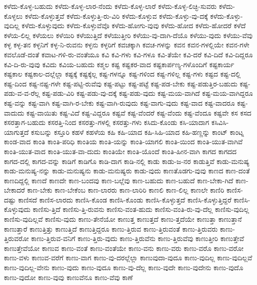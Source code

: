 {ಕಳೆದು-ಕೊಳ್ಳ-ಬಹುದು
ಕಳೆದು-ಕೊಳ್ಳ-ಲಾರ-ನೆಂದು
ಕಳೆದು-ಕೊಳ್ಳ-ಲಾರೆ
ಕಳೆದು-ಕೊಳ್ಳ-ಲಿಚ್ಛಿ-ಸುವರು
ಕಳೆದು-ಕೊಳ್ಳಲು
ಕಳೆದು-ಕೊಳ್ಳುತ್ತವೆ
ಕಳೆದು-ಕೊಳ್ಳುತ್ತಿ-ರು-ವಿರಿ
ಕಳೆದು-ಕೊಳ್ಳುವ
ಕಳೆದು-ಕೊಳ್ಳು-ವು-ದಕ್ಕೆ
ಕಳೆದು-ಕೊಳ್ಳು-ವುದಿಲ್ಲ
ಕಳೆದು-ಕೊಳ್ಳುವುದು
ಕಳೆದು-ಕೊಳ್ಳುವೆವೊ
ಕಳೆದು-ಹೋಗು-ವುವು
ಕಳೆದು-ಹೋದ
ಕಳೆದು-ಹೋದರೆ
ಕಳೆದೆ
ಕಳೆಯ-ಲಿಲ್ಲ
ಕಳೆಯಲು
ಕಳೆಯಿರಿ
ಕಳೆಯುತ್ತಿದೆ
ಕಳೆಯುತ್ತೀರಿ
ಕಳೆಯು-ವು-ದಾಗಿ-ದೆಯೊ
ಕಳೆಯು-ವುದು
ಕಳೆಯು-ವೆವು
ಕಳ್ಳ
ಕಳ್ಳ-ತನ
ಕಳ್ಳನಿಗೆ
ಕಳ್ಳ-ನಿ-ರುವನು
ಕಳ್ಳನು
ಕಳ್ಳರಿಗೆ
ಕವಚಕ್ಕಾಗಿ
ಕವಚ-ಗಳನ್ನು
ಕವನ
ಕವನ-ಗಳಲ್ಲಿಯೇ
ಕವನ-ಗಳೇ
ಕವಲೊಡೆ-ದಂತೆ
ಕವಾಟ-ಗಳಿ-ರು-ವಂತೆಯೂ
ಕವಿ
ಕವಿ-ಗಳು
ಕವಿ-ಗಳೂ
ಕವಿ-ತೆಯೇ
ಕವಿ-ದರೆ
ಕವಿ-ದಿದೆ
ಕವಿ-ದಿದ್ದರೂ
ಕವಿ-ದಿ-ರು-ವುವು
ಕವಿದು
ಕವಿಯ-ಬಹುದು
ಕಶ್ಮಲ
ಕಷ್ಟ
ಕಷ್ಟಕರ-ವಾದ
ಕಷ್ಟಕಾರ್ಪಣ್ಯ-ಗಳೊಂದಿಗೆ
ಕಷ್ಟಕಾರ್ಯ
ಕಷ್ಟಕಾಲ
ಕಷ್ಟಕಾಲ-ದಲ್ಲೆಲ್ಲಾ
ಕಷ್ಟಕ್ಕೆ
ಕಷ್ಟಕ್ಕೆಲ್ಲ
ಕಷ್ಟ-ಗಳನ್ನೂ
ಕಷ್ಟ-ಗಳಿಂದ
ಕಷ್ಟ-ಗಳಿಲ್ಲ
ಕಷ್ಟ-ಗಳು
ಕಷ್ಟದ
ಕಷ್ಟ-ದಲ್ಲಿ
ಕಷ್ಟ-ದಿಂದ
ಕಷ್ಟ-ನಷ್ಟ-ಗಳೇ
ಕಷ್ಟ-ಪಟ್ಟಿ-ರುವೆವು
ಕಷ್ಟ-ಪಟ್ಟು
ಕಷ್ಟ-ಪಟ್ಟೆ
ಕಷ್ಟ-ಪಡ-ಬೇಕು
ಕಷ್ಟ-ಪಡುತ್ತಿರ-ಬಹುದು
ಕಷ್ಟ-ಪಡು-ವ-ವ-ರೆಲ್ಲ
ಕಷ್ಟ-ಪಡು-ವಿರಿ
ಕಷ್ಟ-ಪಡು-ವು-ದಕ್ಕೆ
ಕಷ್ಟ-ಪಡು-ವುದು
ಕಷ್ಟ-ಮಯ-ವಾಗಿದೆ
ಕಷ್ಟ-ಮಯ-ವಾಗಿದ್ದರೂ
ಕಷ್ಟ-ವನ್ನು
ಕಷ್ಟ-ವಾಗಿ
ಕಷ್ಟ-ವಾಗಿ-ರ-ಬೇಕು
ಕಷ್ಟ-ವಾಗಿ-ರುವುದು
ಕಷ್ಟ-ವಾಗು-ವುದು
ಕಷ್ಟ-ವಾದ
ಕಷ್ಟ-ವಾದರೂ
ಕಷ್ಟ-ವಾದುದು
ಕಷ್ಟ-ವಾಯಿತು
ಕಷ್ಟ-ವಿದೆ
ಕಷ್ಟ-ವಿದ್ದರೂ
ಕಷ್ಟವೆ
ಕಷ್ಟ-ವೆಂದರೆ
ಕಷ್ಟ-ವೆಂದು
ಕಷ್ಟ-ವೆಂದೂ
ಕಷ್ಟವೇ
ಕಸ
ಕಸದ
ಕಸರತ್ತಾಗ-ಬಹುದು
ಕಸರತ್ತಿ-ನಿಂದ
ಕಸರತ್ತು-ಗಳಲ್ಲಿ
ಕಸರತ್ತು-ಗಳು
ಕಸಿದು-ಕೊಂಡು
ಕಸಿ-ಯಾದಾಗ
ಕಸಿವಿಸಿ-ಯಾಗುತ್ತದೆ
ಕಸುಬನ್ನು
ಕಸ್ತೂರಿ
ಕಹಳೆ
ಕಹಳೆಯ
ಕಹಿ
ಕಹಿ-ಯಾದ
ಕಹಿ-ಸಿಹಿ-ಯಾದ
ಕಹಿ-ಹಣ್ಣನ್ನು
ಕಾಂಟ್
ಕಾಂಟ್ನ
ಕಾಂಡ-ವಾದ
ಕಾಂತಿ
ಕಾಂತಿ-ಪರಿಧಿ
ಕಾಂತಿಯ
ಕಾಂತಿ-ಯನ್ನು
ಕಾಂತಿ-ಯಾಗಲಿ
ಕಾಂತಿ-ಯಿಂದ
ಕಾಂತಿ-ಯುತ-ವಾಗಿವೆ
ಕಾಂತಿ-ಯುತ-ವಾದ
ಕಾಂತಿ-ಯುತ-ವಾ-ದುದು
ಕಾಂತಿಯೇ
ಕಾಂತಿ-ಯೊಂದೆ
ಕಾಂತಿ-ಹೀನ-ವಾಗಿ
ಕಾಗದ
ಕಾಗದದ
ಕಾಗದ-ದಲ್ಲಿ
ಕಾಗದ-ವನ್ನು
ಕಾಡಿಗೆ
ಕಾಡಿಗೊ
ಕಾಡಿ-ದಾಗ
ಕಾಡಿ-ನಲ್ಲಿ
ಕಾಡು
ಕಾಡು-ಜ-ನರ
ಕಾಡುತ್ತಿವೆ
ಕಾಡು-ಮನುಷ್ಯ
ಕಾಡು-ಮನುಷ್ಯ-ನನ್ನು
ಕಾಡು-ಮನುಷ್ಯನು
ಕಾಡು-ಮನುಷ್ಯರು
ಕಾಡು-ವುದು
ಕಾಣತೊಡಗು-ವುವು
ಕಾಣದ
ಕಾಣ-ದಂತೆ
ಕಾಣದಿದ್ದಲ್ಲಿ
ಕಾಣದೆ
ಕಾಣದೇ
ಕಾಣ-ಬಂದವು
ಕಾಣ-ಬಲ್ಲೆವು
ಕಾಣ-ಬಹುದು
ಕಾಣ-ಬಹುದೆ
ಕಾಣ-ಬೇಕಾ-ಗಿದೆ
ಕಾಣ-ಬೇಕಾದರೆ
ಕಾಣ-ಬೇಕು
ಕಾಣ-ಬೇಕೆಂಬ
ಕಾಣ-ಲಾರರು
ಕಾಣ-ಲಾರಿರಿ
ಕಾಣಲಿ
ಕಾಣ-ಲಿಲ್ಲ
ಕಾಣಲೇ
ಕಾಣಿರಿ
ಕಾಣಿಸ-ದಷ್ಟು
ಕಾಣಿಸದೆ
ಕಾಣಿಸ-ಲಾರದು
ಕಾಣಿಸಿ-ಕೊಂಡ
ಕಾಣಿಸಿ-ಕೊಂಡು
ಕಾಣಿಸಿ-ಕೊಳ್ಳುತ್ತದೆ
ಕಾಣಿಸಿ-ಕೊಳ್ಳುತ್ತಿದ್ದರೆ
ಕಾಣಿಸಿ-ಕೊಳ್ಳುವುದು
ಕಾಣಿಸು-ತ್ತಿದೆ
ಕಾಣಿಸು-ತ್ತಿ-ರುವನು
ಕಾಣಿಸು-ವಂತ-ಹುದು
ಕಾಣಿಸು-ವಂತಿ-ರು-ವು-ದೆಲ್ಲ
ಕಾಣಿಸು-ವುದಿಲ್ಲ
ಕಾಣಿಸು-ವುದಿಲ್ಲವೆ
ಕಾಣಿಸು-ವುದು
ಕಾಣು-ತೇನೆಯೋ
ಕಾಣುತ್ತ
ಕಾಣುತ್ತದೆ
ಕಾಣು-ತ್ತದೆಯೇ
ಕಾಣುತ್ತಾ
ಕಾಣುತ್ತಾನೆ
ಕಾಣುತ್ತಾರೆ
ಕಾಣುತ್ತಿತ್ತು
ಕಾಣುತ್ತಿದೆ
ಕಾಣುತ್ತಿದ್ದರೂ
ಕಾಣು-ತ್ತಿರುವ
ಕಾಣು-ತ್ತಿರುವಂತೆ
ಕಾಣು-ತ್ತಿರುವರು
ಕಾಣು-ತ್ತಿರುವರೋ
ಕಾಣು-ತ್ತಿರುವ-ವನಿಗೆ
ಕಾಣು-ತ್ತಿರು-ವುದು
ಕಾಣು-ತ್ತಿರುವೆನು
ಕಾಣು-ತ್ತಿರುವೆವು
ಕಾಣುತ್ತೀರಿ
ಕಾಣುತ್ತೇವೆ
ಕಾಣುತ್ತೇವೆಯೋ
ಕಾಣುವ
ಕಾಣು-ವಂತೆ
ಕಾಣು-ವಂತೆಯೇ
ಕಾಣು-ವನು
ಕಾಣು-ವರು
ಕಾಣು-ವರೊ
ಕಾಣು-ವರೋ
ಕಾಣು-ವಳು
ಕಾಣುವ-ವರೆಗೆ
ಕಾಣು-ವಾಗ
ಕಾಣು-ವು-ದರಲ್ಲೆಲ್ಲಾ
ಕಾಣುವುದಾ-ವುದೂ
ಕಾಣು-ವುದಿಲ್ಲ
ಕಾಣು-ವುದಿಲ್ಲವೆ
ಕಾಣು-ವುದಿಲ್ಲ-ವೇನು
ಕಾಣು-ವುದು
ಕಾಣು-ವುದೂ
ಕಾಣು-ವು-ದೆಲ್ಲ
ಕಾಣು-ವುದೇ
ಕಾಣು-ವುದೇನು
ಕಾಣು-ವುದೊ
ಕಾಣು-ವುದೋ
ಕಾಣು-ವುವು
ಕಾಣುವೆನೂ
ಕಾಣು-ವೆವು
ಕಾಣೆ
}
